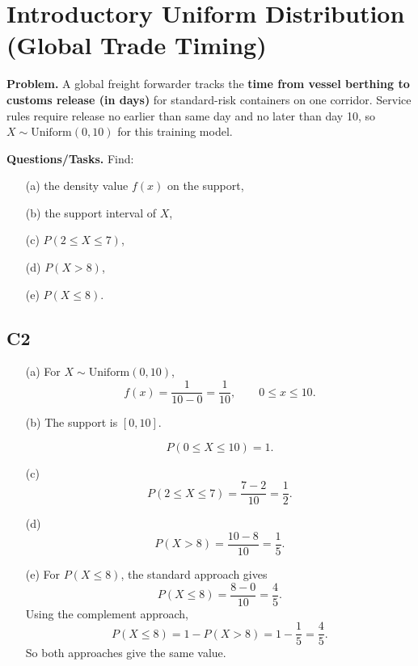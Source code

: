 \section{Introductory Uniform Distribution (Global Trade Timing)}
	
\textbf{Problem.}
A global freight forwarder tracks the \textbf{time from vessel berthing to customs release (in days)} for standard-risk containers on one corridor. Service rules require release no earlier than same day and no later than day 10, so $X\sim \text{Uniform}(0,10)$ for this training model.

\textbf{Questions/Tasks.}
Find:
\begin{itemize}
	\item[(a)] the density value $f(x)$ on the support,
	\item[(b)] the support interval of $X$,
	\item[(c)] $P(2\le X\le 7)$,
	\item[(d)] $P(X>8)$,
	\item[(e)] $P(X\le 8)$.
\end{itemize}

\subsection*{C2}
\begin{itemize}
	\item[(a)] For $X\sim \text{Uniform}(0,10)$,
	\[
	f(x)=\frac{1}{10-0}=\frac{1}{10},\qquad 0\le x\le 10.
	\]
	
	\item[(b)] The support is $[0,10]$.
	
	\[
	P(0\le X\le 10)=1.
	\]
	
	
	\item[(c)]
	\[
	P(2\le X\le 7)=\frac{7-2}{10}=\frac{1}{2}.
	\]
	
	
	\item[(d)]
	\[
	P(X>8)=\frac{10-8}{10}=\frac{1}{5}.
	\]
	
	
	\item[(e)] For $P(X\le 8)$, the standard approach gives
	\[
	P(X\le 8)=\frac{8-0}{10}=\frac{4}{5}.
	\]
	Using the complement approach,
	\[
	P(X\le 8)=1-P(X>8)=1-\frac{1}{5}=\frac{4}{5}.
	\]
	So both approaches give the same value.
	
\end{itemize}

